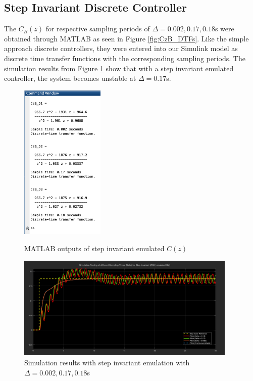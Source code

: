 \documentclass[11pt]{article}
\begin{document}
\subsection{Step Invariant Discrete Controller}
The $C_B(z)$ for respective sampling periods of $\Delta = 0.002, 0.17, 0.18$s were obtained through MATLAB as seen in Figure \ref{fig:CzB_DTFs}. Like the simple approach discrete controllers, they were entered into our Simulink model as discrete time transfer functions with the corresponding sampling periods. The simulation results from Figure \ref{fig:CzB_DSim} show that with a step invariant emulated controller, the system becomes unstable at $\Delta = 0.17$s.

\begin{figure}[H]
\begin{minipage}{.3\textwidth}
    \centering
    \includegraphics[width=4cm]{W3_CzB_DTFs.png}
    \caption{MATLAB outputs of step invariant emulated $C(z)$}
    \label{fig:CzB_DTFs}
\end{minipage}
\hspace{1cm}
\begin{minipage}{.6\textwidth}
    \centering
    \includegraphics[width=10.5cm]{W3_CzB_DSim.png}
    \caption{Simulation results with step invariant emulation with $\Delta = 0.002, 0.17, 0.18$s}
    \label{fig:CzB_DSim}
\end{minipage}
\end{figure}
\end{document}
